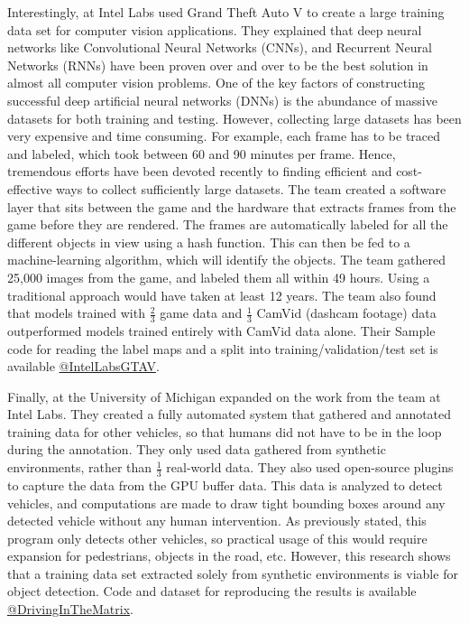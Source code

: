 Interestingly, \cite{Intel-Playing-for-Data} at Intel Labs used Grand Theft Auto V to create a large training data set for computer vision applications. They explained that deep neural networks like Convolutional Neural Networks (CNNs), and Recurrent Neural Networks (RNNs) have been proven over and over to be the best solution in almost all computer vision problems. One of the key factors of constructing successful deep artificial neural networks (DNNs) is the abundance of massive datasets for both training and testing. However, collecting large datasets has been very expensive and time consuming. For example, each frame has to be traced and labeled, which took between 60 and 90 minutes per frame. Hence, tremendous efforts have been devoted recently to finding efficient and cost-effective ways to collect sufficiently large datasets. The team created a software layer that sits between the game and the hardware that extracts frames from the game before they are rendered. The frames are automatically labeled for all the different objects in view using a hash function. This can then be fed to a machine-learning algorithm, which will identify the objects.  The team gathered 25,000 images from the game, and labeled them all within 49 hours. Using a traditional approach would have taken at least 12 years. The team also found that models trained with $\frac{2}{3}$ game data and $\frac{1}{3}$ CamVid (dashcam footage) data outperformed models trained entirely with CamVid data alone. Their Sample code for reading the label maps and a split into training/validation/test set is available  \href{https://download.visinf.tu-darmstadt.de/data/from_games/index.html}{@IntelLabsGTAV}.
\par \bigskip


Finally, \cite{Driving-in-the-Matrix} at the University of Michigan expanded on the work from the team at Intel Labs.  They created a fully automated system that gathered and annotated training data for other vehicles, so that humans did not have to be in the loop during the annotation. They only used data gathered from synthetic environments, rather than $\frac{1}{3}$ real-world data.  They also used open-source plugins to capture the data from the GPU buffer data.  This data is analyzed to detect vehicles, and computations are made to draw tight bounding boxes around any detected vehicle without any human intervention.  As previously stated, this program only detects other vehicles, so practical usage of this would require expansion for pedestrians, objects in the road, etc.  However, this research shows that a training data set extracted solely from synthetic environments is viable for object detection. Code and dataset for reproducing the results is available \href{https://github.com/umautobots/driving-in-the-matrix}{@DrivingInTheMatrix}.
\par \bigskip


